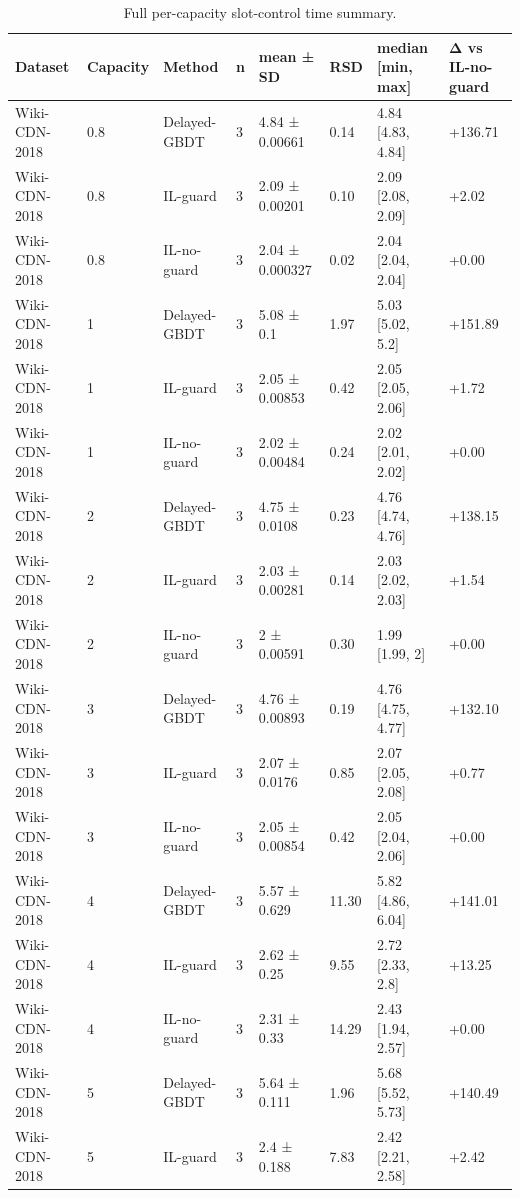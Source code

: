 \begin{table}[t]
\centering
\footnotesize
\caption{Full per-capacity slot-control time summary.}
\label{tab:overhead_runtime_full_appendix}
\begin{tabular}{llllllll}
\toprule
Dataset & Capacity & Method & n & mean ± SD & RSD & median [min, max] & Δ vs IL-no-guard \\
\midrule
Wiki-CDN-2018 & 0.8 & Delayed-GBDT & 3 & 4.84 ± 0.00661 & 0.14 & 4.84 [4.83, 4.84] & +136.71 \\
Wiki-CDN-2018 & 0.8 & IL-guard & 3 & 2.09 ± 0.00201 & 0.10 & 2.09 [2.08, 2.09] & +2.02 \\
Wiki-CDN-2018 & 0.8 & IL-no-guard & 3 & 2.04 ± 0.000327 & 0.02 & 2.04 [2.04, 2.04] & +0.00 \\
Wiki-CDN-2018 & 1 & Delayed-GBDT & 3 & 5.08 ± 0.1 & 1.97 & 5.03 [5.02, 5.2] & +151.89 \\
Wiki-CDN-2018 & 1 & IL-guard & 3 & 2.05 ± 0.00853 & 0.42 & 2.05 [2.05, 2.06] & +1.72 \\
Wiki-CDN-2018 & 1 & IL-no-guard & 3 & 2.02 ± 0.00484 & 0.24 & 2.02 [2.01, 2.02] & +0.00 \\
Wiki-CDN-2018 & 2 & Delayed-GBDT & 3 & 4.75 ± 0.0108 & 0.23 & 4.76 [4.74, 4.76] & +138.15 \\
Wiki-CDN-2018 & 2 & IL-guard & 3 & 2.03 ± 0.00281 & 0.14 & 2.03 [2.02, 2.03] & +1.54 \\
Wiki-CDN-2018 & 2 & IL-no-guard & 3 & 2 ± 0.00591 & 0.30 & 1.99 [1.99, 2] & +0.00 \\
Wiki-CDN-2018 & 3 & Delayed-GBDT & 3 & 4.76 ± 0.00893 & 0.19 & 4.76 [4.75, 4.77] & +132.10 \\
Wiki-CDN-2018 & 3 & IL-guard & 3 & 2.07 ± 0.0176 & 0.85 & 2.07 [2.05, 2.08] & +0.77 \\
Wiki-CDN-2018 & 3 & IL-no-guard & 3 & 2.05 ± 0.00854 & 0.42 & 2.05 [2.04, 2.06] & +0.00 \\
Wiki-CDN-2018 & 4 & Delayed-GBDT & 3 & 5.57 ± 0.629 & 11.30 & 5.82 [4.86, 6.04] & +141.01 \\
Wiki-CDN-2018 & 4 & IL-guard & 3 & 2.62 ± 0.25 & 9.55 & 2.72 [2.33, 2.8] & +13.25 \\
Wiki-CDN-2018 & 4 & IL-no-guard & 3 & 2.31 ± 0.33 & 14.29 & 2.43 [1.94, 2.57] & +0.00 \\
Wiki-CDN-2018 & 5 & Delayed-GBDT & 3 & 5.64 ± 0.111 & 1.96 & 5.68 [5.52, 5.73] & +140.49 \\
Wiki-CDN-2018 & 5 & IL-guard & 3 & 2.4 ± 0.188 & 7.83 & 2.42 [2.21, 2.58] & +2.42 \\

\end{tabular}
\end{table}
